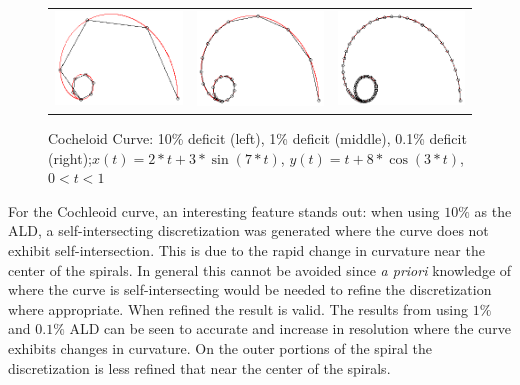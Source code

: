 \begin{figure}[h!]
  \centering
  \begin{tabular}{ccc}
  \includegraphics[width=0.3\linewidth]{Figures/cochleoid01.png} &
  \includegraphics[width=0.3\linewidth]{Figures/cochleoid001.png} &
  \includegraphics[width=0.3\linewidth]{Figures/cochleoid0001.png}
  \end{tabular}
  \caption{\label{fig:lastfigure} Cocheloid Curve: 10\% deficit (left), 1\% deficit (middle), 0.1\% deficit 
(right);\newline $x(t) = 2*t + 3*\sin(7*t)$, $y(t) = t + 8*\cos(3*t)$, $0<t<1$}
  \end{figure}

For the Cochleoid curve, an interesting feature stands out: when using $10\%$ as the ALD, a self-intersecting discretization was generated where the curve does not exhibit self-intersection. This is due to the rapid change in curvature near the center of the spirals. In general this cannot be avoided since {\it a priori} knowledge of where the curve is self-intersecting would be needed to refine the discretization where appropriate. When refined the result is valid. The results from using $1\%$ and $0.1\%$ ALD can be seen to accurate and increase in resolution where the curve exhibits changes in curvature. On the outer portions of the spiral the discretization is less refined that near the center of the spirals.

